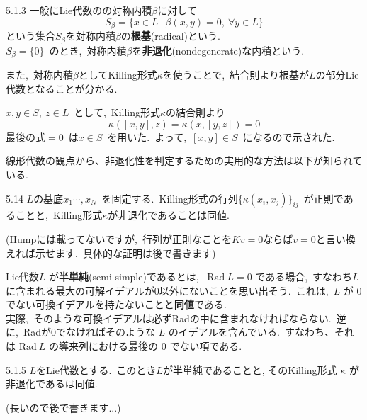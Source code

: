 \documentclass[uplatex,dvipdfmx]{jsarticle}
\begin{document}
\begin{mydef}{5.1.3}
    一般にLie代数のの対称内積$\beta$に対して
    \begin{equation*}
        S_\beta =\{ x\in L ~|~\beta(x,y)=0,~\forall y\in L\}
    \end{equation*}
    という集合$S_\beta$を対称内積$\beta $の\textbf{根基}(radical)という.\\
    $S_\beta =\{0\}$~のとき,~対称内積$\beta $を\textbf{非退化}(nondegenerate)な内積という.
\end{mydef}
また,~対称内積$\beta$としてKilling形式$\kappa$を使うことで,~結合則より根基が$L$の部分Lie代数となることが分かる.
\begin{myproof}
    $x,y\in S,~z\in L$~として,~Killing形式$\kappa$の結合則より
    \begin{equation*}
        \kappa([x,y],z)=\kappa(x,[y,z])=0
    \end{equation*}
    最後の式$=0$~は$x\in S$~を用いた.~よって,~$[x,y]\in S$~になるので示された.
\end{myproof}
線形代数の観点から、非退化性を判定するための実用的な方法は以下が知られている.
\begin{mylemma}{5.14}
    $L$の基底$x_1\cdots ,x_N$~を固定する.~Killing形式の行列$\{\kappa(x_i,x_j)\}_{ij}$~が正則であることと,~Killing形式$\kappa$が非退化であることは同値.
\end{mylemma}
\begin{myproof}
    (Humpには載ってないですが,~行列が正則なことを$Kv=0$ならば$v=0$と言い換えれば示せます.~具体的な証明は後で書きます)
\end{myproof}
Lie代数$L$ が\textbf{半単純}(semi-simple)であるとは,~ $\text{Rad}~ L = 0$ である場合,~すなわち$L$ に含まれる最大の可解イデアルが0以外にないことを思い出そう.~これは,~$L$ が $0$ でない可換イデアルを持たないことと\textbf{同値}である.\\
実際,~そのような可換イデアルは必ずRadの中に含まれなければならない.~逆に,~Radが$0$でなければそのような $L$ のイデアルを含んでいる.~すなわち、それは $\text{Rad}~ L$ の導来列における最後の $0$ でない項である.
\begin{mythm}{5.1.5}
    $L$をLie代数とする.~このとき$L$が半単純であることと, そのKilling形式 $\kappa$ が非退化であるは同値.
\end{mythm}
\begin{myproof}
    (長いので後で書きます...)
\end{myproof}
\newpage
\end{document}
